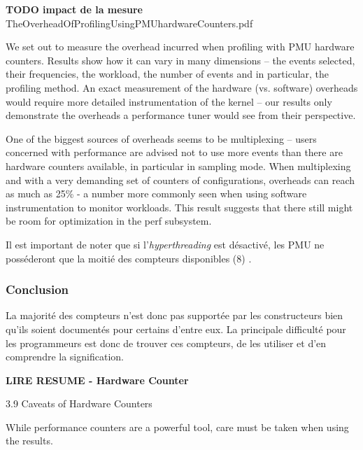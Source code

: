    \textbf{TODO impact de la mesure} TheOverheadOfProfilingUsingPMUhardwareCounters.pdf
        
    We set out to measure the overhead incurred when profiling with PMU hardware counters. Results show how it can vary in many dimensions – the events selected, their frequencies, the workload, the number of events and in particular, the profiling method. An exact measurement of the hardware (vs. software) overheads would require more detailed instrumentation of the kernel – our results only demonstrate the overheads a performance tuner would see from their perspective.
    
    One of the biggest sources of overheads seems to be multiplexing – users concerned with performance are advised not to use more events than there are hardware counters available, in particular in sampling mode. When multiplexing and with a very demanding set of counters of configurations, overheads can reach as much as 25\% - a number more commonly seen when using software instrumentation to monitor workloads. This result suggests that there still might be room for optimization in the perf subsystem.    
        

        
        
        
        
        
        
        
        
        
        
        
        
        
        Il est important de noter que si l'\textit{hyperthreading} est désactivé, les PMU ne posséderont que la moitié des compteurs disponibles (8) .
        
    \subsubsection{Conclusion}

    La majorité des compteurs n'est donc pas supportée par les constructeurs bien qu'ils soient documentés pour certains d'entre eux. La  principale difficulté pour les programmeurs est donc de trouver ces compteurs, de les utiliser et d'en comprendre la signification. 


\textbf{LIRE RESUME - Hardware Counter}

3.9 Caveats of Hardware Counters

While performance counters are a powerful tool, care must be taken when
using the results.

